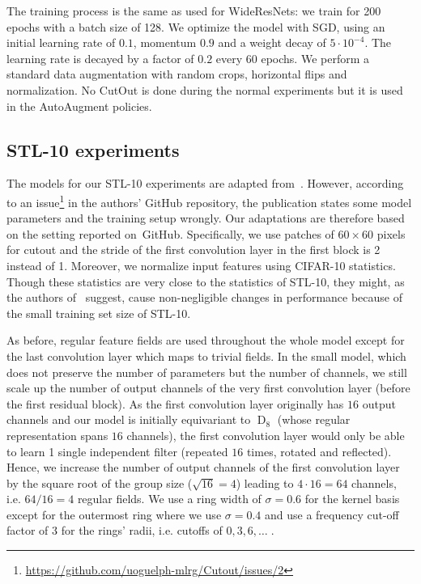 \documentclass{article}
\newcommand{\D}[1]{\ensuremath{\operatorname{D}_{#1}}}
\begin{document}
The training process is the same as used for WideResNets: we train for 200 epochs with a batch size of 128. 
We optimize the model with SGD, using an initial learning rate of $0.1$, momentum $0.9$ and a weight decay of $5\cdot10^{-4}$.
The learning rate is decayed by a factor of $0.2$ every 60 epochs.
We perform a standard data augmentation with random crops, horizontal flips and normalization.
No CutOut is done during the normal experiments but it is used in the AutoAugment policies.



\subsection{STL-10 experiments}
\label{apx:stl10}

The models for our STL-10 experiments are adapted from~\cite{cutout}.
However, according to an issue\footnote{\url{https://github.com/uoguelph-mlrg/Cutout/issues/2}}
in the authors' GitHub repository, the publication states some model parameters and the training setup wrongly.
Our adaptations are therefore based on the setting reported on~GitHub.
Specifically, we use patches of $60\times60$ pixels for cutout and the stride of the first convolution layer in the first block is 2 instead of 1.
Moreover, we normalize input features using CIFAR-10 statistics.
Though these statistics are very close to the statistics of STL-10, they might, as the authors of~\cite{cutout} suggest, cause non-negligible changes in performance because of the small training set size of STL-10.

As before, regular feature fields are used throughout the whole model except for the last convolution layer which maps to trivial fields.
In the small model, which does not preserve the number of parameters but the number of channels, we still scale up the number of output channels of the very first convolution layer (before the first residual block).
As the first convolution layer originally has $16$ output channels and our model is initially equivariant to $\D8$ (whose regular representation spans $16$ channels), the first convolution layer would only be able to learn 1 single independent filter (repeated $16$ times, rotated and reflected).
Hence, we increase the number of output channels of the first convolution layer by the square root of the group size ($\sqrt{16} = 4$) leading to $4 \cdot 16 = 64$ channels, i.e. $64/16 = 4$ regular fields.
We use a ring width of $\sigma=0.6$ for the kernel basis except for the outermost ring where we use $\sigma = 0.4$ and use a frequency cut-off factor of $3$ for the rings' radii, i.e. cutoffs of $0,3,6,\dots\;$.
\end{document}
